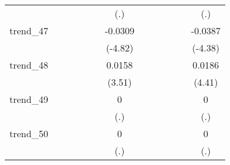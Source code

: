 {\begin{tabular}{l*{12}{c}}
            &                     &                     &                     &                     &                     &         (.)         &                     &                     &                     &                     &                     &         (.)         \\
[1em]
trend\_47    &                     &                     &                     &                     &                     &     -0.0309\sym{***}&                     &                     &                     &                     &                     &     -0.0387\sym{***}\\
            &                     &                     &                     &                     &                     &     (-4.82)         &                     &                     &                     &                     &                     &     (-4.38)         \\
[1em]
trend\_48    &                     &                     &                     &                     &                     &      0.0158\sym{***}&                     &                     &                     &                     &                     &      0.0186\sym{***}\\
            &                     &                     &                     &                     &                     &      (3.51)         &                     &                     &                     &                     &                     &      (4.41)         \\
[1em]
trend\_49    &                     &                     &                     &                     &                     &           0         &                     &                     &                     &                     &                     &           0         \\
            &                     &                     &                     &                     &                     &         (.)         &                     &                     &                     &                     &                     &         (.)         \\
[1em]
trend\_50    &                     &                     &                     &                     &                     &           0         &                     &                     &                     &                     &                     &           0         \\
            &                     &                     &                     &                     &                     &         (.)         &                     &                     &                     &                     &                     &         (.)         \\

\end{tabular}}
